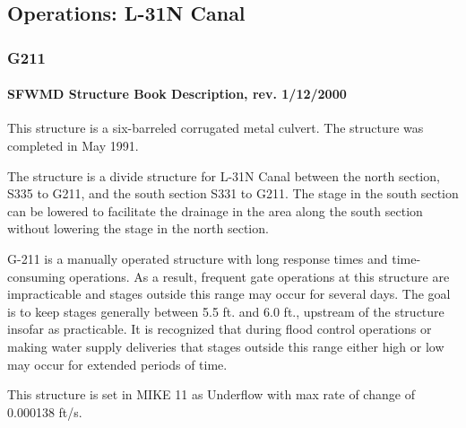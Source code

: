 
\clearpage

\subsection{Operations: L-31N Canal}

\subsubsection{G211}


\paragraph{SFWMD Structure Book Description, rev. 1/12/2000}
This structure is a six-barreled corrugated metal culvert. The structure was completed in May 1991.

The structure is a divide structure for L-31N Canal between the north section, S335 to G211, and the south section S331 to G211.
The stage in the south section can be lowered to facilitate the drainage in the area along the south section without lowering the stage in the north section.

G-211 is a manually operated structure with long response times and time-consuming operations.
As a result, frequent gate operations at this structure are impracticable and stages outside this range may occur for several days.
The goal is to keep stages generally between 5.5 ft. and 6.0 ft., upstream of the structure insofar as practicable.
It is recognized that during flood control operations or making water supply deliveries that stages outside this range either high or low may occur for extended periods of time.

This structure is set in MIKE 11 as Underflow with max rate of change of 0.000138 ft/s.


